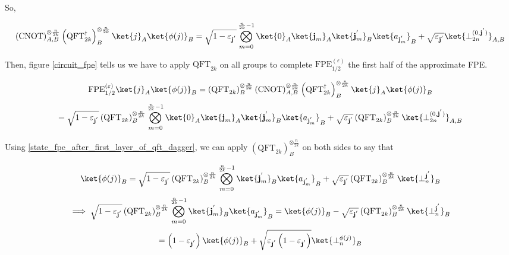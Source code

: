 So, 

\begin{equation}
    \left(\text{CNOT}\right)_{A,B}^{\otimes \frac{n}{2k}}\left(\text{QFT}^{\dagger}_{2k}\right)_B^{\otimes \frac{n}{2k}} \ket{j}_A\ket{\phi(j)}_B  = \sqrt{1 - \varepsilon_{\textbf{j}^{'}}}\bigotimes_{m=0}^{\frac{n}{2k}-1}\ket{0}_A\ket{\textbf{j}_m}_A\ket{\textbf{j}_m^{'}}_B\ket{a_{\textbf{j}_m^{'}}}_B + \sqrt{\varepsilon_{\textbf{j}^{'}}}\ket{\perp_{2n}^{(0,\textbf{j}^{'})}}_{A,B}
    \label{state_fpe_after_first_layer_of_cnots}
\end{equation}

Then, figure \ref{circuit_fpe} tells us we have to apply $\text{QFT}_{2k}$ on all groups to complete $\text{FPE}^{(\varepsilon)}_{1/2}$ the first half of the approximate FPE.

\begin{equation*}
    \text{FPE}^{(\varepsilon)}_{1/2}\ket{j}_A\ket{\phi(j)}_B = \left(\text{QFT}_{2k}\right)_B^{\otimes \frac{n}{2k}}\left(\text{CNOT}\right)_{A,B}^{\otimes \frac{n}{2k}}\left(\text{QFT}^{\dagger}_{2k}\right)_B^{\otimes \frac{n}{2k}} \ket{j}_A\ket{\phi(j)}_B
\end{equation*}
\begin{equation*}
    = \sqrt{1 - \varepsilon_{\textbf{j}^{'}}}\left(\text{QFT}_{2k}\right)_B^{\otimes \frac{n}{2k}}\bigotimes_{m=0}^{\frac{n}{2k}-1}\ket{0}_A\ket{\textbf{j}_m}_A\ket{\textbf{j}_m^{'}}_B\ket{a_{\textbf{j}_m^{'}}}_B + \sqrt{\varepsilon_{\textbf{j}^{'}}}\left(\text{QFT}_{2k}\right)_B^{\otimes \frac{n}{2k}}\ket{\perp_{2n}^{(0,\textbf{j}^{'})}}_{A,B}
\end{equation*}

Using \ref{state_fpe_after_first_layer_of_qft_dagger}, we can apply $\left(\text{QFT}_{2k}\right)^{\otimes \frac{n}{2k}}_B$ on both sides to say that

\begin{equation*}
    \ket{\phi(j)}_B = \sqrt{1-\varepsilon_{\textbf{j}^{'}}} \left(\text{QFT}_{2k}\right)^{\otimes \frac{n}{2k}}_B\bigotimes_{m=0}^{\frac{n}{2k}-1}\ket{\textbf{j}^{'}_m}_B\ket{a_{\textbf{j}^{'}_m}}_B + \sqrt{\varepsilon_{\textbf{j}^{'}}}\left(\text{QFT}_{2k}\right)^{\otimes \frac{n}{2k}}_B\ket{\perp_{n}^{\textbf{j}^{'}}}_B
\end{equation*}
\begin{equation*}
    \implies \sqrt{1-\varepsilon_{\textbf{j}^{'}}} \left(\text{QFT}_{2k}\right)^{\otimes \frac{n}{2k}}_B\bigotimes_{m=0}^{\frac{n}{2k}-1}\ket{\textbf{j}^{'}_m}_B\ket{a_{\textbf{j}^{'}_m}}_B = \ket{\phi(j)}_B - \sqrt{\varepsilon_{\textbf{j}^{'}}}\left(\text{QFT}_{2k}\right)^{\otimes \frac{n}{2k}}_B\ket{\perp_{n}^{\textbf{j}^{'}}}_B
\end{equation*}
\begin{equation*}
    = \left(1 - \varepsilon_{\textbf{j}^{'}}\right)\ket{\phi(j)}_B + \sqrt{\varepsilon_{\textbf{j}^{'}}\left(1 - \varepsilon_{\textbf{j}^{'}}\right)}\ket{\perp_n^{\phi(j)}}_B
\end{equation*}

